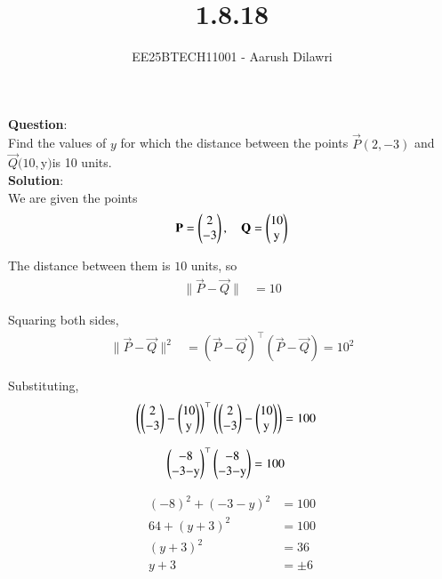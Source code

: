 \documentclass[journal]{IEEEtran}
\begin{document}

\vspace{3cm}

\title{1.8.18}
\author{EE25BTECH11001 - Aarush Dilawri}
{\let\newpage\relax\maketitle}

\renewcommand{\thefigure}{\theenumi}
\renewcommand{\thetable}{\theenumi}
\setlength{\intextsep}{10pt} %
\textbf{Question}:\\
Find the values of $y$ for which the distance between the points $\vec{P}(2,-3)$ and $\vec{Q}(10,$y$)$is 10 units.\\
\textbf{Solution}:\\

We are given the points
\begin{align*}
\vec{P} = \myvec{2\\-3}, \quad 
\vec{Q} = \myvec{10\\$y$}
\end{align*}

The distance between them is $10$ units, so
\begin{align*}
\|\vec{P}-\vec{Q}\| &= 10
\end{align*}

Squaring both sides,
\begin{align*}
\|\vec{P}-\vec{Q}\|^2 &= (\vec{P}-\vec{Q})^\top(\vec{P}-\vec{Q}) = 10^2
\end{align*}

Substituting,
\begin{align*}
\left( \myvec{2\\-3} - \myvec{10\\$y$} \right)^\top
\left( \myvec{2\\-3} - \myvec{10\\$y$} \right) &= 100
\end{align*}

\begin{align*}
\myvec{-8\\-3-$y$}^\top \myvec{-8\\-3-$y$} &= 100
\end{align*}

\begin{align*}
(-8)^2 + (-3-y)^2 &= 100 \\
64 + (y+3)^2 &= 100 \\
(y+3)^2 &= 36 \\
y+3 &= \pm 6
\end{align*}
\end{document}
